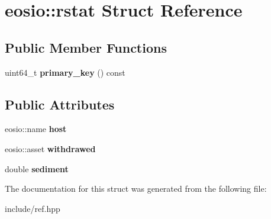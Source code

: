 \hypertarget{structeosio_1_1rstat}{}\section{eosio\+:\+:rstat Struct Reference}
\label{structeosio_1_1rstat}
\subsection*{Public Member Functions}
\begin{DoxyCompactItemize}
\item 
\mbox{\label{structeosio_1_1rstat_ab6e305b881620e16b1ea0856b5f5ff4f}} 
uint64\+\_\+t {\bfseries primary\+\_\+key} () const
\end{DoxyCompactItemize}
\subsection*{Public Attributes}
\begin{DoxyCompactItemize}
\item 
\mbox{\label{structeosio_1_1rstat_a7cca7c5e0bf43b7daa0172b7c8a1287d}} 
eosio\+::name {\bfseries host}
\item 
\mbox{\label{structeosio_1_1rstat_a8ef06192071e32f478100d85eac59a24}} 
eosio\+::asset {\bfseries withdrawed}
\item 
\mbox{\label{structeosio_1_1rstat_ade5843558de9ac24069f89d1158523f1}} 
double {\bfseries sediment}
\end{DoxyCompactItemize}


The documentation for this struct was generated from the following file\+:\begin{DoxyCompactItemize}
\item 
include/ref.\+hpp\end{DoxyCompactItemize}
